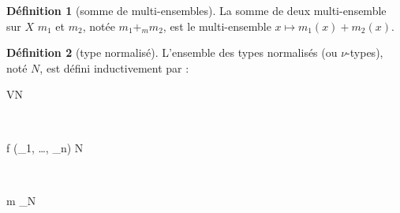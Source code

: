 \documentclass [a4paper,12pt] {article}
\theoremstyle {definition}
\newtheorem {définition} {Définition} [section]
\newcommand {\interval} [2] {[\![#1\,;#2]\!]}
\newcommand {\V} {\mathscr V}
\begin{document}
\begin {définition} [somme de multi-ensembles]
	La somme de deux multi-ensemble sur $X$ $m_1$ et $m_2$, notée $m_1 +_m m_2$, est le multi-ensemble $x \mapsto m_1 (x) + m_2 (x)$.
\end {définition}

\begin {définition} [type normalisé]
	L'ensemble des types normalisés (ou $\nu$-types), noté $N$, est défini inductivement par :
	\begin {center}
		\begin {prooftree}
			 {\V \subseteq N}
		\end {prooftree}
		\\[1em]
		\begin {prooftree}
			\Hypo {(f : n) \in  \Sigma}
			\Hypo {\forall i \in \interval 1 n,\ \nu_i \in N}
			 {f (\nu_1, \dots, \nu_n) \in N}
		\end {prooftree}
		\\[1em]
		\begin {prooftree}
			\Hypo {m \in N^\sharp}
			\Hypo {\nu \in N}
			 {m \rightarrow_\nu \nu \in N}
		\end {prooftree}
	\end {center}
\end {définition}

\end{document}
